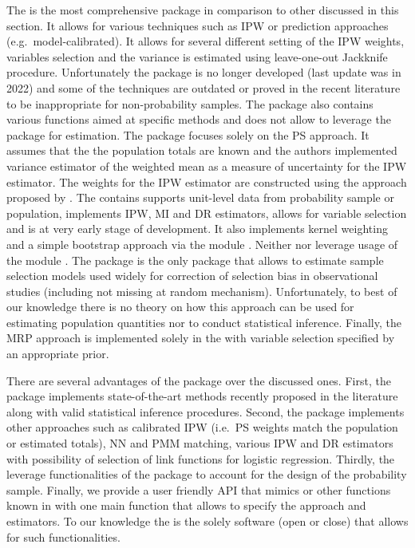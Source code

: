 \documentclass[
]{jss}
\begin{document}
The  is the most comprehensive package in comparison to
other discussed in this section. It allows for various techniques such
as IPW or prediction approaches (e.g.~model-calibrated). It allows for
several different setting of the IPW weights, variables selection and
the variance is estimated using leave-one-out Jackknife procedure.
Unfortunately the package is no longer developed (last update was in
2022) and some of the techniques are outdated or proved in the recent
literature to be inappropriate for non-probability samples. The package
also contains various functions aimed at specific methods and does not
allow to leverage the  package for estimation. The
 package focuses solely on the PS approach. It assumes that
the the population totals are known and the authors implemented variance
estimator of the weighted mean as a measure of uncertainty for the IPW
estimator. The weights for the IPW estimator are constructed using the
approach proposed by \citet{Schonlau2017}. The  contains
supports unit-level data from probability sample or population,
implements IPW, MI and DR estimators, allows for variable selection and
is at very early stage of development. It also implements kernel
weighting and a simple bootstrap approach via the 
module \citep{scipy2020}. Neither  nor  leverage
usage of the  module \citep{Diallo2021}. The 
package is the only package that allows to estimate sample selection
models used widely for correction of selection bias in observational
studies (including not missing at random mechanism). Unfortunately, to
best of our knowledge there is no theory on how this approach can be
used for estimating population quantities nor to conduct statistical
inference. Finally, the MRP approach is implemented solely in the
 with variable selection specified by an appropriate
prior.

There are several advantages of the  package over the
discussed ones. First, the package implements state-of-the-art methods
recently proposed in the literature along with valid statistical
inference procedures. Second, the package implements other approaches
such as calibrated IPW (i.e.~PS weights match the population or
estimated totals), NN and PMM matching, various IPW and DR estimators
with possibility of selection of link functions for logistic regression.
Thirdly, the  leverage functionalities of the
 package to account for the design of the probability
sample. Finally, we provide a user friendly API that mimics 
or other functions known in  with one main function that
allows to specify the approach and estimators. To our knowledge the
 is the solely software (open or close) that allows for
such functionalities.
\end{document}
